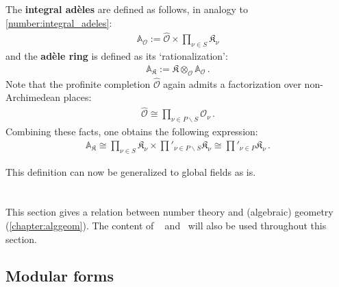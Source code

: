     The \textbf{integral ad\`eles} are defined as follows, in analogy to \cref{number:integral_adeles}:
    \begin{gather}
        \mathbb{A}_{\mathcal{O}} := \widehat{\mathcal{O}}\times\prod_{\nu\in S}\mathfrak{K}_\nu
    \end{gather}
    and the \textbf{ad\`ele ring} is defined as its `rationalization':
    \begin{gather}
        \mathbb{A}_{\mathfrak{K}} := \mathfrak{K}\otimes_{\mathcal{O}}\mathbb{A}_{\mathcal{O}}\,.
    \end{gather}
    Note that the profinite completion $\widehat{\mathcal{O}}$ again admits a factorization over non-Archimedean places:
    \begin{gather}
        \widehat{\mathcal{O}}\cong\prod_{\nu\in P\backslash S}\mathcal{O}_\nu\,.
    \end{gather}
    Combining these facts, one obtains the following expression:
    \begin{gather}
        \mathbb{A}_{\mathfrak{K}}\cong\prod_{\nu\in S}\mathfrak{K}_\nu\times\prod'_{\nu\in P\backslash S}\mathfrak{K}_\nu\cong\prod'_{\nu\in P}\mathfrak{K}_\nu\,.
    \end{gather}

    This definition can now be generalized to global fields as is.

\section{}

    This section gives a relation between number theory and (algebraic) geometry (\cref{chapter:alggeom}). The content of ~ and~ will also be used throughout this section.

\subsection{Modular forms}\label{section:modular_forms}

